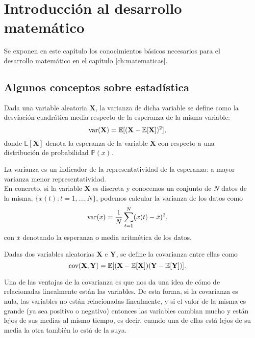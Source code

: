 \chapter{Introducción al desarrollo matemático}
\label{ch:introMates}

Se exponen en este capítulo los conocimientos básicos necesarios para el desarrollo matemático en el capítulo \ref{ch:matematicas}.

\section{Algunos conceptos sobre estadística}

\begin{definicion}[Varianza]
	Dada una variable aleatoria $\mathbf{X}$, la varianza de dicha variable se define como la desviación cuadrática media respecto de la esperanza de la misma variable:
	\[	\text{var}{(\mathbf{X})} = \mathbb{E}[(\mathbf{X} - \mathbb{E}[\mathbf{X}])^2],	\]
	donde $\mathbb{E}[\mathbf{X}]$ denota la esperanza de la variable $\mathbf{X}$ con respecto a una distribución de probabilidad $\mathbb{P}(x)$.
\end{definicion}

La varianza es un indicador de la representatividad de la esperanza: a mayor varianza menor representatividad.\\

En concreto, si la variable $\mathbf{X}$ es discreta y conocemos un conjunto de $N$ datos de la misma, $\{x(t); t=1,\dots,N\}$, podemos calcular la varianza de los datos como 
\[	\text{var}{(x)} = \frac{1}{N} \sum_{t=1}^N(x(t)-\bar{x})^2,	\]
con $\bar{x}$ denotando la esperanza o media aritmética de los datos.

\begin{definicion}[Covarianza]
	Dadas dos variables aleatorias $\mathbf{X}$ e $\mathbf{Y}$, se define la covarianza entre ellas como
	\[	\text{cov}{(\mathbf{X}, \mathbf{Y})} = \mathbb{E}[(\mathbf{X}-\mathbb{E}[\mathbf{X}])(\mathbf{Y}-\mathbb{E}[\mathbf{Y}])].	\]
\end{definicion}

Una de las ventajas de la covarianza es que nos da una idea de cómo de relacionadas linealmente están las variables. De esta forma, si la covarianza es nula, las variables no están relacionadas linealmente, y si el valor de la misma es grande (ya sea positivo o negativo) entonces las variables cambian mucho y están lejos de sus medias al mismo tiempo, es decir, cuando una de ellas está lejos de su media la otra también lo está de la suya.

